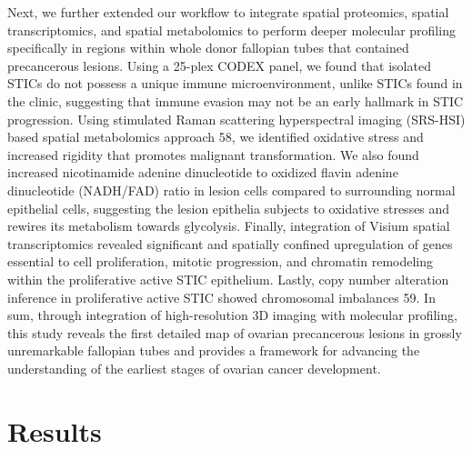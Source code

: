 \begin{refsection}
    Next, we further extended our workflow to integrate spatial proteomics, spatial transcriptomics, and spatial metabolomics to perform deeper molecular profiling specifically in regions within whole donor fallopian tubes that contained precancerous lesions. Using a 25-plex CODEX panel, we found that isolated STICs do not possess a unique immune microenvironment, unlike STICs found in the clinic, suggesting that immune evasion may not be an early hallmark in STIC progression. Using stimulated Raman scattering hyperspectral imaging (SRS-HSI) based spatial metabolomics approach\cite{Zhang2024Multi} 58, we identified oxidative stress and increased rigidity that promotes malignant transformation. We also found increased nicotinamide adenine dinucleotide to oxidized flavin adenine dinucleotide (NADH/FAD) ratio in lesion cells compared to surrounding normal epithelial cells, suggesting the lesion epithelia subjects to oxidative stresses and rewires its metabolism towards glycolysis. Finally, integration of Visium spatial transcriptomics revealed significant and spatially confined upregulation of genes essential to cell proliferation, mitotic progression, and chromatin remodeling within the proliferative active STIC epithelium. Lastly, copy number alteration inference in proliferative active STIC showed chromosomal imbalances\cite{Patel2014Single} 59. 
    In sum, through integration of high-resolution 3D imaging with molecular profiling, this study reveals the first detailed map of ovarian precancerous lesions in grossly unremarkable fallopian tubes and provides a framework for advancing the understanding of the earliest stages of ovarian cancer development.
    
    \section{Results}
    

\end{refsection}
